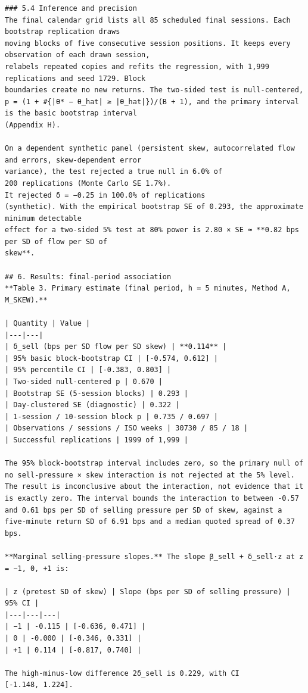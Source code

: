 \documentclass[11pt]{article}
\begin{document}
\begin{verbatim}
### 5.4 Inference and precision
The final calendar grid lists all 85 scheduled final sessions. Each bootstrap replication draws
moving blocks of five consecutive session positions. It keeps every observation of each drawn session,
relabels repeated copies and refits the regression, with 1,999 replications and seed 1729. Block
boundaries create no new returns. The two-sided test is null-centered,
p = (1 + #{|θ* − θ_hat| ≥ |θ_hat|})/(B + 1), and the primary interval is the basic bootstrap interval
(Appendix H).

On a dependent synthetic panel (persistent skew, autocorrelated flow and errors, skew-dependent error
variance), the test rejected a true null in 6.0% of
200 replications (Monte Carlo SE 1.7%).
It rejected δ = −0.25 in 100.0% of replications
(synthetic). With the empirical bootstrap SE of 0.293, the approximate minimum detectable
effect for a two-sided 5% test at 80% power is 2.80 × SE ≈ **0.82 bps per SD of flow per SD of
skew**.

## 6. Results: final-period association
**Table 3. Primary estimate (final period, h = 5 minutes, Method A, M_SKEW).**

| Quantity | Value |
|---|---|
| δ_sell (bps per SD flow per SD skew) | **0.114** |
| 95% basic block-bootstrap CI | [-0.574, 0.612] |
| 95% percentile CI | [-0.383, 0.803] |
| Two-sided null-centered p | 0.670 |
| Bootstrap SE (5-session blocks) | 0.293 |
| Day-clustered SE (diagnostic) | 0.322 |
| 1-session / 10-session block p | 0.735 / 0.697 |
| Observations / sessions / ISO weeks | 30730 / 85 / 18 |
| Successful replications | 1999 of 1,999 |

The 95% block-bootstrap interval includes zero, so the primary null of no sell-pressure × skew interaction is not rejected at the 5% level. The result is inconclusive about the interaction, not evidence that it is exactly zero. The interval bounds the interaction to between -0.57 and 0.61 bps per SD of selling pressure per SD of skew, against a five-minute return SD of 6.91 bps and a median quoted spread of 0.37 bps.

**Marginal selling-pressure slopes.** The slope β_sell + δ_sell·z at z = −1, 0, +1 is:

| z (pretest SD of skew) | Slope (bps per SD of selling pressure) | 95% CI |
|---|---|---|
| −1 | -0.115 | [-0.636, 0.471] |
| 0 | -0.000 | [-0.346, 0.331] |
| +1 | 0.114 | [-0.817, 0.740] |

The high-minus-low difference 2δ_sell is 0.229, with CI
[-1.148, 1.224].


\end{verbatim}
\end{document}
